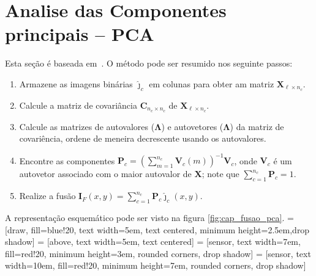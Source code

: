 \section{Analise das Componentes principais -- PCA}
Esta seção é baseada em~\cite{n_r,mit}. O método pode ser resumido nos seguinte passos:

\begin{enumerate}
\item Armazene as imagens binárias $\bm{\widehat\jmath}_c$ em colunas para obter am matriz $\bm X_{\ell\times n_c}$.
\item Calcule a matriz de covariância $\bm C_{n_c\times n_c}$ de $\bm X_{\ell\times n_c}$.
\item Calcule as matrizes de autovalores ($\bm\Lambda$) e autovetores ($\bm\Lambda$) da matriz de covariência, ordene de meneira decrescente usando os autovalores.
\item Encontre as componentes $\bm P_c=(\sum_{m=1}^{n_c} \bm V_c(m))^{-1}{\bm V_c}$, onde $\bm V_c$ é um autovetor associado com o maior autovalor de $\bm X$; note que $\sum_{c=1}^{n_c}\bm P_c=1$.
\item Realize a fusão $\bm I_F(x,y)=\sum_{c=1}^{n_c}\bm P_c\bm{\widehat\jmath}_c(x,y)$.
\end{enumerate}
A representação esquemático pode ser visto na figura \eqref{fig:cap_fusao_pca}.
=[draw, fill=blue!20, text width=5em, 
    text centered, minimum height=2.5em,drop shadow]
 = [above, text width=5em, text centered]
 = [sensor, text width=7em, fill=red!20, 
    minimum height=3em, rounded corners, drop shadow]
 = [sensor, text width=10em, fill=red!20, 
    minimum height=7em, rounded corners, drop shadow]
\def\blockdist{2.3}
\def\edgedist{2.5}
